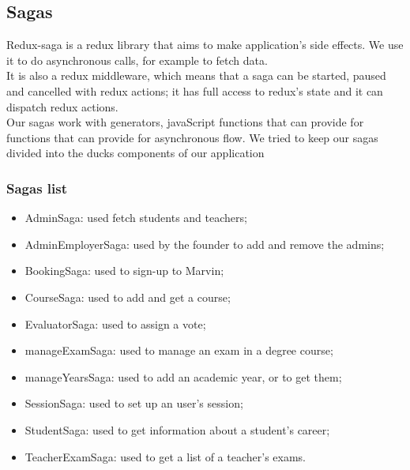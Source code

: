 \documentclass[../redux]{subfiles}
\begin{document}
	\subsection{Sagas}
	Redux-saga is a redux library that aims to make application's side effects. We use it to do asynchronous calls, for example to fetch data.\\
	It is also a redux middleware, which means that a saga can be started, paused and cancelled with redux actions; it has full access to redux's state and it can dispatch redux actions.\\
	Our sagas work with generators, javaScript functions that can provide for functions that can provide for asynchronous flow. We tried to keep our sagas divided into the ducks components of our application
	
	\subsubsection{Sagas list}
	\begin{itemize}
		\item AdminSaga: used fetch students and teachers;
		\item AdminEmployerSaga: used by the founder to add and remove the admins;
		\item BookingSaga: used to sign-up to Marvin;
		\item CourseSaga: used to add and get a course;
		\item EvaluatorSaga: used to assign a vote;
		\item manageExamSaga: used to manage an exam in a degree course;
		\item manageYearsSaga: used to add an academic year, or to get them;
		\item SessionSaga: used to set up an user's session;
		\item StudentSaga: used to get information about a student's career;
		\item TeacherExamSaga: used to get a list of a teacher's exams.
	\end{itemize}
\end{document}

